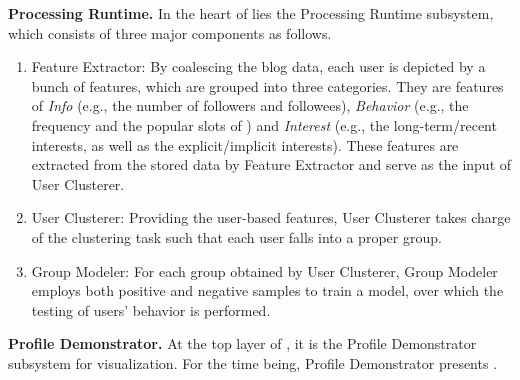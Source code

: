 \textbf{Processing Runtime.}
In the heart of \sys{} lies the Processing Runtime subsystem, which consists of three major components as follows.
\begin{enumerate}
	\item Feature Extractor: By coalescing the blog data, each user is depicted by a bunch of features, which are grouped into three categories. They are features of \textit{Info} (e.g., the number of followers and followees), \textit{Behavior} (e.g., the frequency and the popular slots of \retg{}) and \textit{Interest} (e.g., the long-term/recent interests, as well as the explicit/implicit interests). These features are extracted from the stored data by Feature Extractor and serve as the input of User Clusterer.
	\item User Clusterer: Providing the user-based features, User Clusterer takes charge of the clustering task such that each user falls into a proper group. 
	\item Group Modeler: For each group obtained by User Clusterer, Group Modeler employs both positive and negative samples to train a model, over which the testing of users' \retg{} behavior is performed.
\end{enumerate}
	
\textbf{Profile Demonstrator.} At the top layer of \sys{}, it is the Profile Demonstrator subsystem for visualization. 
For the time being, Profile Demonstrator presents \tbc{}.



